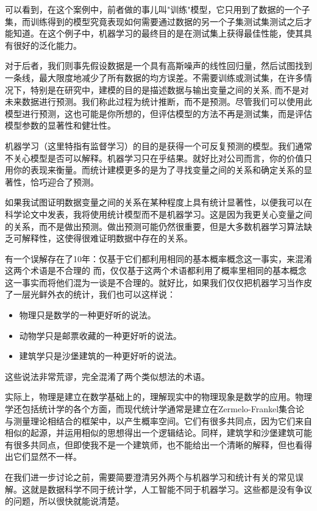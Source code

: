 可以看到，在这个案例中，前者做的事儿叫"训练"模型，它只用到了数据的一个子集，而训练得到的模型究竟表现如何需要通过数据的另一个子集测试集测试之后才能知道。在这个例子中，机器学习的最终目的是在测试集上获得最佳性能，使其具有很好的泛化能力。

对于后者，我们则事先假设数据是一个具有高斯噪声的线性回归量，然后试图找到一条线，最大限度地减少了所有数据的均方误差。不需要训练或测试集，在许多情况下，特别是在研究中，建模的目的是描述数据与输出变量之间的关系, 而不是对未来数据进行预测。我们称此过程为统计推断，而不是预测。尽管我们可以使用此模型进行预测，这也可能是你所想的，但评估模型的方法不再是测试集，而是评估模型参数的显著性和健壮性。

机器学习（这里特指有监督学习）的目的是获得一个可反复预测的模型。我们通常不关心模型是否可以解释。机器学习只在乎结果。就好比对公司而言，你的价值只用你的表现来衡量。而统计建模更多的是为了寻找变量之间的关系和确定关系的显著性，恰巧迎合了预测。

如果我试图证明数据变量之间的关系在某种程度上具有统计显著性，以便我可以在科学论文中发表，我将使用统计模型而不是机器学习。这是因为我更关心变量之间的关系，而不是做出预测。做出预测可能仍然很重要，但是大多数机器学习算法缺乏可解释性，这使得很难证明数据中存在的关系。

有一个误解存在了10年：仅基于它们都利用相同的基本概率概念这一事实，来混淆这两个术语是不合理的
而，仅仅基于这两个术语都利用了概率里相同的基本概念这一事实而将他们混为一谈是不合理的。就好比，如果我们仅仅把机器学习当作皮了一层光鲜外衣的统计，我们也可以这样说：

\begin{itemize}
	\item 物理只是数学的一种更好听的说法。
	\item 动物学只是邮票收藏的一种更好听的说法。
	\item 建筑学只是沙堡建筑的一种更好听的说法。
\end{itemize}

这些说法非常荒谬，完全混淆了两个类似想法的术语。

实际上，物理是建立在数学基础上的，理解现实中的物理现象是数学的应用。物理学还包括统计学的各个方面，而现代统计学通常是建立在Zermelo-Frankel集合论与测量理论相结合的框架中，以产生概率空间。它们有很多共同点，因为它们来自相似的起源，并运用相似的思想得出一个逻辑结论。同样，建筑学和沙堡建筑可能有很多共同点，但即使我不是一个建筑师，也不能给出一个清晰的解释，但也看得出它们显然不一样。

在我们进一步讨论之前，需要简要澄清另外两个与机器学习和统计有关的常见误解。这就是数据科学不同于统计学，人工智能不同于机器学习。这些都是没有争议的问题，所以很快就能说清楚。

